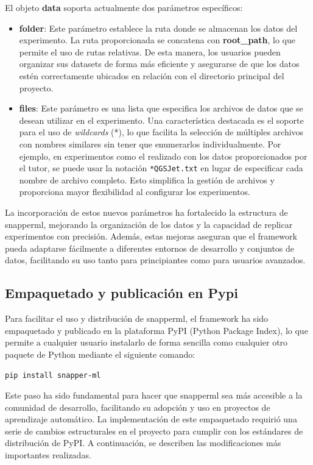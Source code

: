 El objeto \textbf{data} soporta actualmente dos parámetros específicos:

\begin{itemize}
    \item \textbf{folder}: Este parámetro establece la ruta donde se almacenan los datos del experimento. La ruta proporcionada se concatena con \textbf{root\_path}, lo que permite el uso de rutas relativas. De esta manera, los usuarios pueden organizar sus datasets de forma más eficiente y asegurarse de que los datos estén correctamente ubicados en relación con el directorio principal del proyecto.
    \item \textbf{files}: Este parámetro es una lista que especifica los archivos de datos que se desean utilizar en el experimento. Una característica destacada es el soporte para el uso de \textit{wildcards} (*), lo que facilita la selección de múltiples archivos con nombres similares sin tener que enumerarlos individualmente. Por ejemplo, en experimentos como el realizado con los datos proporcionados por el tutor, se puede usar la notación \texttt{*QGSJet.txt} en lugar de especificar cada nombre de archivo completo. Esto simplifica la gestión de archivos y proporciona mayor flexibilidad al configurar los experimentos.
\end{itemize}

La incorporación de estos nuevos parámetros ha fortalecido la estructura de \Gls{snapperml}, mejorando la organización de los datos y la capacidad de replicar experimentos con precisión. Además, estas mejoras aseguran que el \gls{framework} pueda adaptarse fácilmente a diferentes entornos de desarrollo y conjuntos de datos, facilitando su uso tanto para principiantes como para usuarios avanzados.


\subsection{Empaquetado y publicación en Pypi}
Para facilitar el uso y distribución de \Gls{snapperml}, el \gls{framework} ha sido empaquetado y publicado en la plataforma PyPI (Python Package Index), lo que permite a cualquier usuario instalarlo de forma sencilla como cualquier otro paquete de Python mediante el siguiente comando:
\begin{verbatim}
pip install snapper-ml
\end{verbatim}

Este paso ha sido fundamental para hacer que \Gls{snapperml} sea más accesible a la comunidad de desarrollo, facilitando su adopción y uso en proyectos de aprendizaje automático. La implementación de este empaquetado requirió una serie de cambios estructurales en el proyecto para cumplir con los estándares de distribución de PyPI. A continuación, se describen las modificaciones más importantes realizadas.

